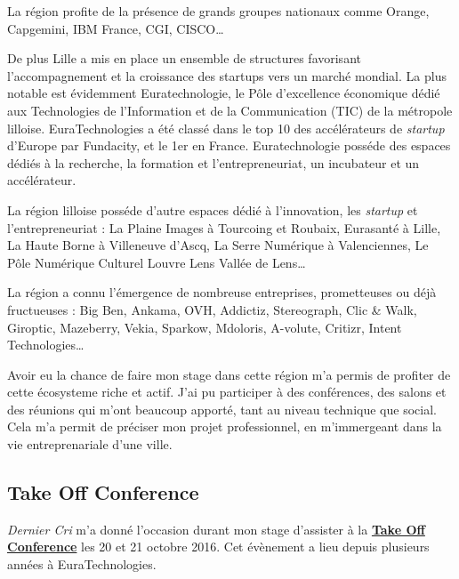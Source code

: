 \documentclass[12pt,a4paper]{article}
\begin{document}
  La région profite de la présence de grands groupes nationaux comme
  Orange, Capgemini, IBM France, CGI, CISCO\ldots{}

  \bigskip

  De plus Lille a mis en place un ensemble de structures favorisant
  l'accompagnement et la croissance des startups vers un marché mondial.
  La plus notable est évidemment Euratechnologie, le Pôle d'excellence
  économique dédié aux Technologies de l'Information et de la
  Communication (TIC) de la métropole lilloise. EuraTechnologies a été
  classé dans le top 10 des accélérateurs de \emph{startup} d'Europe par
  Fundacity, et le 1er en France. Euratechnologie posséde des espaces
  dédiés à la recherche, la formation et l'entrepreneuriat, un incubateur
  et un accélérateur.

  \bigskip

  La région lilloise posséde d'autre espaces dédié à l'innovation, les
  \emph{startup} et l'entrepreneuriat : La Plaine Images à Tourcoing et
  Roubaix, Eurasanté à Lille, La Haute Borne à Villeneuve d'Ascq, La Serre
  Numérique à Valenciennes, Le Pôle Numérique Culturel Louvre Lens Vallée
  de Lens\ldots{}

  \bigskip

  La région a connu l'émergence de nombreuse entreprises, prometteuses ou
  déjà fructueuses : Big Ben, Ankama, OVH, Addictiz, Stereograph, Clic \&
  Walk, Giroptic, Mazeberry, Vekia, Sparkow, Mdoloris, A-volute, Critizr,
  Intent Technologies\ldots{}

  \bigskip

  Avoir eu la chance de faire mon stage dans cette région m'a permis de
  profiter de cette écosysteme riche et actif. J'ai pu participer à des
  conférences, des salons et des réunions qui m'ont beaucoup apporté, tant
  au niveau technique que social. Cela m'a permit de préciser mon projet
  professionnel, en m'immergeant dans la vie entreprenariale d'une ville.

  \bigskip

  \subsection{Take Off Conference}\label{take-off-conference}

  \bigskip

  \emph{Dernier Cri} m'a donné l'occasion durant mon stage d'assister à la
  \href{http://takeoffconf.com/2016}{\textbf{Take Off Conference}} les 20
  et 21 octobre 2016. Cet évènement a lieu depuis plusieurs années à
  EuraTechnologies.
\end{document}
